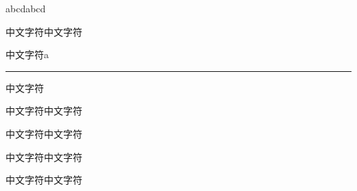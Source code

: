\documentclass{article}
\begin{document}
abcd\cite{sally_history_1985}abcd

中文字符\cite{sally_history_1985}中文字符

中文字符\cite{sally_history_1985}a\rule{1em}{1pt}中文字符

中文字符\cite{sally_history_1985}\mbox{}中文字符

中文字符\cite{sally_history_1985}\hbox{}中文字符

中文字符\cite{sally_history_1985}\makebox{}中文字符%

中文字符\cite{sally_history_1985}\hspace{0pt}中文字符%


\printbibliography
\end{document}
